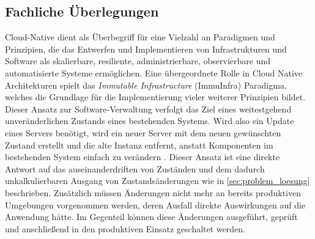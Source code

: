 \documentclass[11pt]{scrartcl}
\begin{document}
\subsection{Fachliche Überlegungen}
Cloud-Native dient als Überbegriff für eine Vielzahl an Paradigmen und Prinzipien, die das Entwerfen und Implementieren von Infrastrukturen und Software als skalierbare, resiliente, administrierbare, observierbare und automatisierte Systeme ermöglichen. Eine übergeordnete Rolle in Cloud Native Architekturen spielt das \textit{Immutable Infrastructure} (ImmuInfra) Paradigma, welches die Grundlage für die Implementierung vieler weiterer Prinzipien bildet. Dieser Ansatz zur Software-Verwaltung verfolgt das Ziel eines weitestgehend unveränderlichen Zustands eines bestehenden Systems. Wird also ein Update eines Servers benötigt, wird ein neuer Server mit dem neuen gewünschten Zustand erstellt und die alte Instanz entfernt, anstatt Komponenten im bestehenden System einfach zu verändern \cite{Hirschfeld:2018}. 
Dieser Ansatz ist eine direkte Antwort auf das auseinanderdriften von Zuständen und dem dadurch unkalkulierbaren Ausgang von Zustandsänderungen wie in \cref{sec:problem_loesung} beschrieben. Zusätzlich müssen Änderungen nicht mehr an bereits produktiven Umgebungen vorgenommen werden, deren Ausfall direkte Auswirkungen auf die Anwendung hätte. Im Gegenteil können diese Änderungen ausgeführt, geprüft und anschließend in den produktiven Einsatz geschaltet werden.
\end{document}
